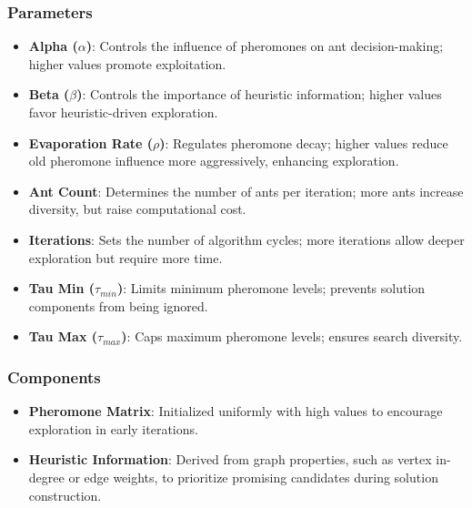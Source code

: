 \documentclass{article}
\begin{document}
\subsubsection*{Parameters}
\begin{itemize}
    \item \textbf{Alpha ($\alpha$)}: Controls the influence of pheromones on ant decision-making; higher values promote exploitation.
    \item \textbf{Beta ($\beta$)}: Controls the importance of heuristic information; higher values favor heuristic-driven exploration.
    \item \textbf{Evaporation Rate ($\rho$)}: Regulates pheromone decay; higher values reduce old pheromone influence more aggressively, enhancing exploration.
    \item \textbf{Ant Count}: Determines the number of ants per iteration; more ants increase diversity, but raise computational cost.
    \item \textbf{Iterations}: Sets the number of algorithm cycles; more iterations allow deeper exploration but require more time.
    \item \textbf{Tau Min ($\tau_{min}$)}: Limits minimum pheromone levels; prevents solution components from being ignored.
    \item \textbf{Tau Max ($\tau_{max}$)}: Caps maximum pheromone levels; ensures search diversity.
\end{itemize}


\subsubsection*{Components}
\begin{itemize}
    \item \textbf{Pheromone Matrix}: Initialized uniformly with high values to encourage exploration in early iterations.
    \item \textbf{Heuristic Information}: Derived from graph properties, such as vertex in-degree or edge weights, to prioritize promising candidates during solution construction.
\end{itemize}
\end{document}
